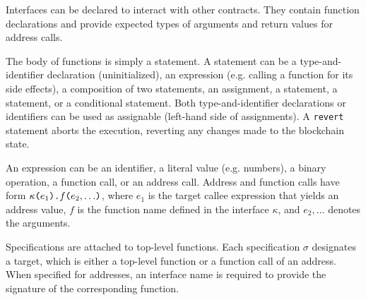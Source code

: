 Interfaces can be declared to interact with other contracts. They contain function declarations and provide expected types of arguments and return values for address calls.

The body of functions is simply a statement. %
A statement can be a type-and-identifier declaration (uninitialized),
an expression (e.g. calling a function for its side effects), a
composition of two statements, an assignment, a  statement, a  statement,
or a conditional statement.
Both type-and-identifier declarations or identifiers can be used as assignable (left-hand side of assignments).
A \texttt{revert} statement aborts the execution, reverting any changes made to
the blockchain state.

An expression can be an identifier, a literal value (e.g. numbers), a binary
operation, a function call, or an address call.
Address and function calls have form $\kappa \texttt{(} {e_1} \texttt{).}{f} \texttt{(} {e_2, \dots} \texttt{)}$,
where $e_1$ is the target callee expression that yields an address value,
$f$ is the function name defined in the interface $\kappa$,
and $e_2, \dots$ denotes the arguments.

Specifications are attached to top-level functions.
Each specification $\sigma$ designates a target, which is either a top-level function or
a function call of an address.
When specified for addresses, an interface name is required to provide the signature
of the corresponding function.

